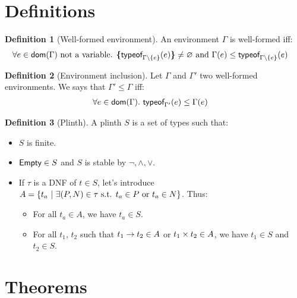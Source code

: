 \documentclass[a4paper]{article}
\theoremstyle{definition}
\newtheorem{definition}{Definition}
\begin{document}
    \section{Definitions}
      
    \begin{definition}[Well-formed environment]
      An environment $\Gamma$ is well-formed iff:
      \begin{align*}
        &\forall e \in \textsf{dom}(\Gamma) \text{ not a variable. } \textbf{\textup{\{}}\textsf{typeof}_{\Gamma\setminus\{e\}}(e)\textbf{\textup{\}}} \neq \varnothing \text{ and } \Gamma(e) \leq \textsf{typeof}_{\Gamma\setminus\{e\}}(e)
      \end{align*}
    \end{definition}
  
    \begin{definition}[Environment inclusion]
      Let $\Gamma$ and $\Gamma'$ two well-formed environments. We says that $\Gamma' \leq \Gamma$ iff:
      \begin{align*}
        &\forall e \in \textsf{dom}(\Gamma).\ \textsf{typeof}_{\Gamma'}(e) \leq \Gamma(e)
      \end{align*}
    \end{definition}
    
    \begin{definition}[Plinth]
      A plinth $S$ is a set of types such that:
      \begin{itemize}
        \item $S$ is finite.
        \item $\textsf{Empty} \in S$ and $S$ is stable by $\neg, \land, \vee$. 
        \item If $\tau$ is a DNF of $t\in S$, let's introduce $A=\{t_a ~|~ \exists (P,N) \in \tau \text{ s.t. } t_a \in P \text{ or } t_a \in N \}$. Thus:
        \begin{itemize}
          \item For all $t_a \in A$, we have $t_a \in S$.
          \item For all $t_1$, $t_2$ such that $t_1\to t_2 \in A$ or $t_1\times t_2 \in A$,
          we have $t_1 \in S$ and $t_2 \in S$.
        \end{itemize}
      \end{itemize}
    \end{definition}

    \section{Theorems}
\end{document}
